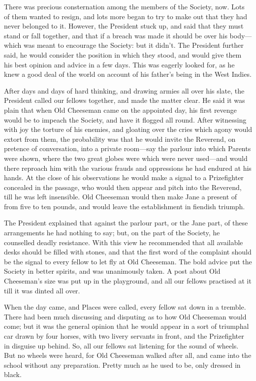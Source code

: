 There was precious consternation among the members of the Society,
now.  Lots of them wanted to resign, and lots more began to try to
make out that they had never belonged to it.  However, the President
stuck up, and said that they must stand or fall together, and that
if a breach was made it should be over his body---which was meant to
encourage the Society:  but it didn't.  The President further said,
he would consider the position in which they stood, and would give
them his best opinion and advice in a few days.  This was eagerly
looked for, as he knew a good deal of the world on account of his
father's being in the West Indies.

After days and days of hard thinking, and drawing armies all over
his slate, the President called our fellows together, and made the
matter clear.  He said it was plain that when Old Cheeseman came on
the appointed day, his first revenge would be to impeach the
Society, and have it flogged all round.  After witnessing with joy
the torture of his enemies, and gloating over the cries which agony
would extort from them, the probability was that he would invite the
Reverend, on pretence of conversation, into a private room---say the
parlour into which Parents were shown, where the two great globes
were which were never used---and would there reproach him with the
various frauds and oppressions he had endured at his hands.  At the
close of his observations he would make a signal to a Prizefighter
concealed in the passage, who would then appear and pitch into the
Reverend, till he was left insensible.  Old Cheeseman would then
make Jane a present of from five to ten pounds, and would leave the
establishment in fiendish triumph.

The President explained that against the parlour part, or the Jane
part, of these arrangements he had nothing to say; but, on the part
of the Society, he counselled deadly resistance.  With this view he
recommended that all available desks should be filled with stones,
and that the first word of the complaint should be the signal to
every fellow to let fly at Old Cheeseman.  The bold advice put the
Society in better spirits, and was unanimously taken.  A post about
Old Cheeseman's size was put up in the playground, and all our
fellows practised at it till it was dinted all over.

When the day came, and Places were called, every fellow sat down in
a tremble.  There had been much discussing and disputing as to how
Old Cheeseman would come; but it was the general opinion that he
would appear in a sort of triumphal car drawn by four horses, with
two livery servants in front, and the Prizefighter in disguise up
behind.  So, all our fellows sat listening for the sound of wheels.
But no wheels were heard, for Old Cheeseman walked after all, and
came into the school without any preparation.  Pretty much as he
used to be, only dressed in black.

